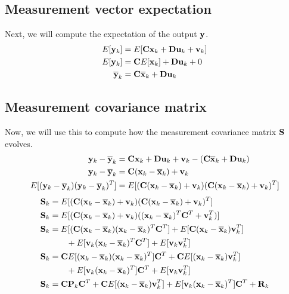 \subsection{Measurement vector expectation}

Next, we will compute the expectation of the \gls{output} $\mathbf{y}$.
\begin{align*}
  E[\mathbf{y}_k] &= E[\mathbf{C}\mathbf{x}_k + \mathbf{D}\mathbf{u}_k + \mathbf{v}_k] \\
  E[\mathbf{y}_k] &= \mathbf{C}E[\mathbf{x}_k] + \mathbf{D}\mathbf{u}_k + 0 \\
  \overline{\mathbf{y}}_k &= \mathbf{C}\overline{\mathbf{x}}_k + \mathbf{D}\mathbf{u}_k
\end{align*}

\subsection{Measurement covariance matrix}

Now, we will use this to compute how the measurement covariance matrix
$\mathbf{S}$ evolves.
\begin{align*}
  \mathbf{y}_k - \overline{\mathbf{y}}_k &= \mathbf{C}\mathbf{x}_k + \mathbf{D}\mathbf{u}_k + \mathbf{v}_k -
    (\mathbf{C}\overline{\mathbf{x}}_k + \mathbf{D}\mathbf{u}_k) \\
  \mathbf{y}_k - \overline{\mathbf{y}}_k &= \mathbf{C}(\mathbf{x}_k - \overline{\mathbf{x}}_k) + \mathbf{v}_k \\
  E[(\mathbf{y}_k - \overline{\mathbf{y}}_k)(\mathbf{y}_k - \overline{\mathbf{y}}_k)^T] &=
    E[(\mathbf{C}(\mathbf{x}_k - \overline{\mathbf{x}}_k) + \mathbf{v}_k)
      (\mathbf{C}(\mathbf{x}_k - \overline{\mathbf{x}}_k) + \mathbf{v}_k)^T]
\end{align*}
\begin{align*}
  \mathbf{S}_k &=
    E[(\mathbf{C}(\mathbf{x}_k - \overline{\mathbf{x}}_k) + \mathbf{v}_k)
      (\mathbf{C}(\mathbf{x}_k - \overline{\mathbf{x}}_k) + \mathbf{v}_k)^T] \\
  \mathbf{S}_k &=
    E[(\mathbf{C}(\mathbf{x}_k - \overline{\mathbf{x}}_k) + \mathbf{v}_k)
      ((\mathbf{x}_k - \overline{\mathbf{x}}_k)^T\mathbf{C}^T + \mathbf{v}_k^T)] \\
  \mathbf{S}_k &=
    E[(\mathbf{C}(\mathbf{x}_k - \overline{\mathbf{x}}_k)(\mathbf{x}_k - \overline{\mathbf{x}}_k)^T
      \mathbf{C}^T] +
    E[\mathbf{C}(\mathbf{x}_k - \overline{\mathbf{x}}_k)\mathbf{v}_k^T] \\
    &\qquad + E[\mathbf{v}_k(\mathbf{x}_k - \overline{\mathbf{x}}_k)^T\mathbf{C}^T] +
    E[\mathbf{v}_k\mathbf{v}_k^T] \\
  \mathbf{S}_k &=
    \mathbf{C}E[(\mathbf{x}_k - \overline{\mathbf{x}}_k)(\mathbf{x}_k - \overline{\mathbf{x}}_k)^T]
    \mathbf{C}^T + \mathbf{C}E[(\mathbf{x}_k - \overline{\mathbf{x}}_k)\mathbf{v}_k^T] \\
    &\qquad + E[\mathbf{v}_k(\mathbf{x}_k - \overline{\mathbf{x}}_k)^T]\mathbf{C}^T +
    E[\mathbf{v}_k\mathbf{v}_k^T] \\
  \mathbf{S}_k &= \mathbf{C}\mathbf{P}_k\mathbf{C}^T +
    \mathbf{C}E[(\mathbf{x}_k - \overline{\mathbf{x}}_k)\mathbf{v}_k^T] +
    E[\mathbf{v}_k(\mathbf{x}_k - \overline{\mathbf{x}}_k)^T]\mathbf{C}^T +
    \mathbf{R}_k
\end{align*}

